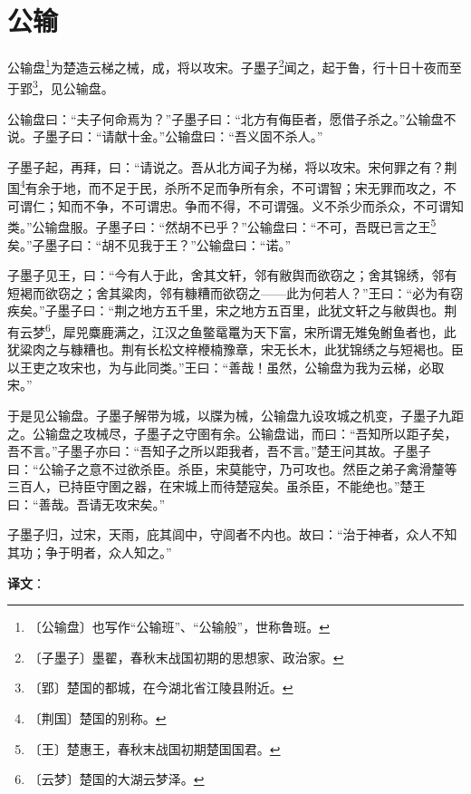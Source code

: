 \documentclass[12pt,UTF-8,openany]{ctexbook}
\begin{document}
\chapter{公输}

\begin{normalsize}
    
    公输盘\footnote{〔公输盘〕也写作“公输班”、“公输般”，世称鲁班。}为楚造云梯之械，成，将以攻宋。子墨子\footnote{〔子墨子〕墨翟，春秋末战国初期的思想家、政治家。}闻之，起于鲁，行十日十夜而至于郢\footnote{〔郢〕楚国的都城，在今湖北省江陵县附近。}，见公输盘。
    
    公输盘曰：“夫子何命焉为？”子墨子曰：“北方有侮臣者，愿借子杀之。”公输盘不说。子墨子曰：“请献十金。”公输盘曰：“吾义固不杀人。”
    
    子墨子起，再拜，曰：“请说之。吾从北方闻子为梯，将以攻宋。宋何罪之有？荆国\footnote{〔荆国〕楚国的别称。}有余于地，而不足于民，杀所不足而争所有余，不可谓智；宋无罪而攻之，不可谓仁；知而不争，不可谓忠。争而不得，不可谓强。义不杀少而杀众，不可谓知类。”公输盘服。子墨子曰：“然胡不已乎？”公输盘曰：“不可，吾既已言之王\footnote{〔王〕楚惠王，春秋末战国初期楚国国君。}矣。”子墨子曰：“胡不见我于王？”公输盘曰：“诺。”
    
    子墨子见王，曰：“今有人于此，舍其文轩，邻有敝舆而欲窃之；舍其锦绣，邻有短褐而欲窃之；舍其粱肉，邻有糠糟而欲窃之——此为何若人？”王曰：“必为有窃疾矣。”子墨子曰：“荆之地方五千里，宋之地方五百里，此犹文轩之与敝舆也。荆有云梦\footnote{〔云梦〕楚国的大湖云梦泽。}，犀兕麋鹿满之，江汉之鱼鳖鼋鼍为天下富，宋所谓无雉兔鲋鱼者也，此犹粱肉之与糠糟也。荆有长松文梓楩楠豫章，宋无长木，此犹锦绣之与短褐也。臣以王吏之攻宋也，为与此同类。”王曰：“善哉！虽然，公输盘为我为云梯，必取宋。”
    
    于是见公输盘。子墨子解带为城，以牒为械，公输盘九设攻城之机变，子墨子九距之。公输盘之攻械尽，子墨子之守圉有余。公输盘诎，而曰：“吾知所以距子矣，吾不言。”子墨子亦曰：“吾知子之所以距我者，吾不言。”楚王问其故。子墨子曰：“公输子之意不过欲杀臣。杀臣，宋莫能守，乃可攻也。然臣之弟子禽滑釐等三百人，已持臣守圉之器，在宋城上而待楚寇矣。虽杀臣，不能绝也。”楚王曰：“善哉。吾请无攻宋矣。”
    
    子墨子归，过宋，天雨，庇其闾中，守闾者不内也。故曰：“治于神者，众人不知其功；争于明者，众人知之。”
\end{normalsize}


\newpage

\textbf{译文}：

\vspace{1em}
\end{document}
